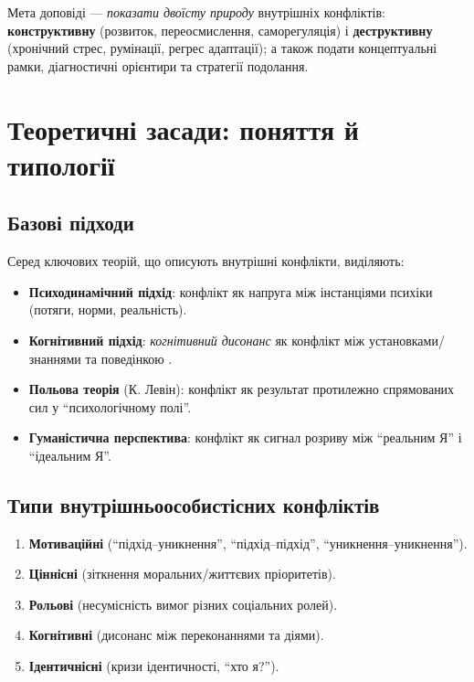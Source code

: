 \documentclass[12pt,a4paper]{article}
\newcommand{\term}[1]{\textbf{#1}}
\begin{document}
Мета доповіді — \emph{показати двоїсту природу} внутрішніх конфліктів: \textbf{конструктивну} (розвиток, переосмислення, саморегуляція) і \textbf{деструктивну} (хронічний стрес, румінації, регрес адаптації); а також подати концептуальні рамки, діагностичні орієнтири та стратегії подолання.

\section{Теоретичні засади: поняття й типології}
\subsection{Базові підходи}
Серед ключових теорій, що описують внутрішні конфлікти, виділяють:
\begin{itemize}[left=6mm]
    \item \term{Психодинамічний підхід}: конфлікт як напруга між інстанціями психіки (потяги, норми, реальність).
    \item \term{Когнітивний підхід}: \emph{когнітивний дисонанс} як конфлікт між установками/знаннями та поведінкою \cite{Festinger1957}.
    \item \term{Польова теорія} (К. Левін): конфлікт як результат протилежно спрямованих сил у \enquote{психологічному полі}.
    \item \term{Гуманістична перспектива}: конфлікт як сигнал розриву між \enquote{реальним Я} і \enquote{ідеальним Я}.
\end{itemize}

\subsection{Типи внутрішньоособистісних конфліктів}
\begin{enumerate}[left=6mm,label=\arabic*)]
    \item \term{Мотиваційні} (\enquote{підхід–уникнення}, \enquote{підхід–підхід}, \enquote{уникнення–уникнення}).
    \item \term{Ціннісні} (зіткнення моральних/життєвих пріоритетів).
    \item \term{Рольові} (несумісність вимог різних соціальних ролей).
    \item \term{Когнітивні} (дисонанс між переконаннями та діями).
    \item \term{Ідентичнісні} (кризи ідентичності, \enquote{хто я?}).
\end{enumerate}
\end{document}
